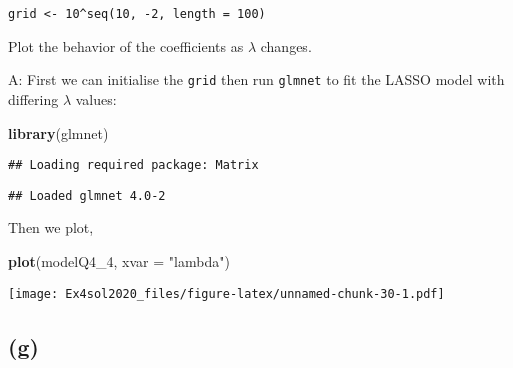 \documentclass[
]{article}
\newenvironment{Shaded}{\begin{snugshade}}{\end{snugshade}}
\newcommand{\DataTypeTok}[1]{\textcolor[rgb]{0.13,0.29,0.53}{#1}}
\newcommand{\DecValTok}[1]{\textcolor[rgb]{0.00,0.00,0.81}{#1}}
\newcommand{\KeywordTok}[1]{\textcolor[rgb]{0.13,0.29,0.53}{\textbf{#1}}}
\newcommand{\NormalTok}[1]{#1}
\newcommand{\OperatorTok}[1]{\textcolor[rgb]{0.81,0.36,0.00}{\textbf{#1}}}
\newcommand{\StringTok}[1]{\textcolor[rgb]{0.31,0.60,0.02}{#1}}
\begin{document}
\texttt{grid\ \textless{}-\ 10\^{}seq(10,\ -2,\ length\ =\ 100)}

Plot the behavior of the coefficients as \(\lambda\) changes.

A: First we can initialise the \texttt{grid} then run \texttt{glmnet} to
fit the LASSO model with differing \(\lambda\) values:

\begin{Shaded}
\begin{Highlighting}[]
\KeywordTok{library}\NormalTok{(glmnet)}
\end{Highlighting}
\end{Shaded}

\begin{verbatim}
## Loading required package: Matrix
\end{verbatim}

\begin{verbatim}
## Loaded glmnet 4.0-2
\end{verbatim}

\begin{Shaded}
\end{Shaded}

Then we plot,

\begin{Shaded}
\begin{Highlighting}[]
\KeywordTok{plot}\NormalTok{(modelQ4_}\DecValTok{4}\NormalTok{, }\DataTypeTok{xvar =} \StringTok{"lambda"}\NormalTok{)}
\end{Highlighting}
\end{Shaded}

\texttt{[image: Ex4sol2020\_files/figure-latex/unnamed-chunk-30-1.pdf]}

\hypertarget{g}{%
\subsection{(g)}\label{g}}
\end{document}
